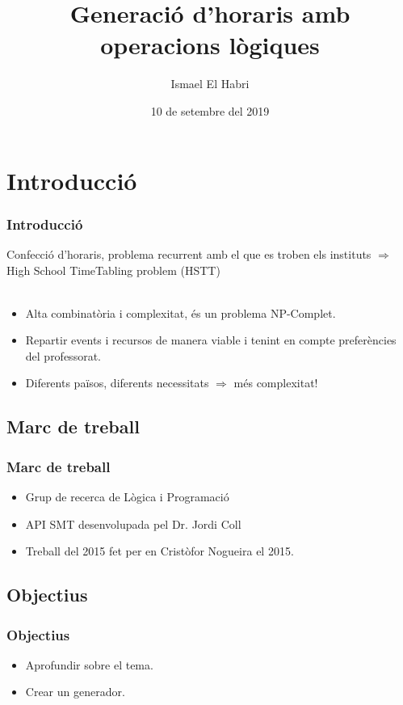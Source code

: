 \documentclass[8pt]{beamer}
\title{Generació d'horaris amb operacions lògiques}
\author{Ismael El Habri}
\date[KPT 2004] %
{10 de setembre del 2019}
\begin{document}
\frame{\titlepage}

\section{Introducció}
  \begin{frame}
    \frametitle{Introducció}

    Confecció d'horaris, problema recurrent amb el que es troben els instituts $\Rightarrow$ High School TimeTabling problem (HSTT)\\ ~\\
    
    \begin{itemize}
      \item Alta combinatòria i complexitat, és un problema NP-Complet.
      \item Repartir events i recursos de manera viable i tenint en compte preferències del professorat.
      \item Diferents països, diferents necessitats  $\Rightarrow$  més complexitat!
    \end{itemize}
    
    


  \end{frame}
  \subsection{Marc de treball}
  \begin{frame}
    \frametitle{Marc de treball}
    \begin{itemize}
      \item Grup de recerca de Lògica i Programació
    
      \item API SMT desenvolupada pel Dr. Jordi Coll

      \item Treball del 2015 fet per en Cristòfor Nogueira el 2015.
    \end{itemize}

  \end{frame}
  
  \subsection{Objectius}

  \begin{frame}
    \frametitle{Objectius}

    \begin{itemize}
    
      \item Aprofundir sobre el tema.
      \item Crear un generador.
    
    \end{itemize}
          
  \end{frame}
  
\end{document}
